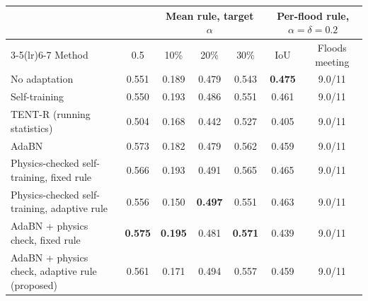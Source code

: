 \begin{tabular}{lcccccc}
\toprule
 & & \multicolumn{3}{c}{Mean rule, target $\alpha$} & \multicolumn{2}{c}{Per-flood rule, $\alpha=\delta=0.2$} \\
\cmidrule(lr){3-5}\cmidrule(lr){6-7}
Method & 0.5 & 10\% & 20\% & 30\% & IoU & Floods meeting \\
\midrule
No adaptation & 0.551 & 0.189 & 0.479 & 0.543 & \textbf{0.475} & 9.0/11 \\
Self-training \citep{chen2026cimttda} & 0.550 & 0.193 & 0.486 & 0.551 & 0.461 & 9.0/11 \\
TENT-R (running statistics) & 0.504 & 0.168 & 0.442 & 0.527 & 0.405 & 9.0/11 \\
AdaBN & 0.573 & 0.182 & 0.479 & 0.562 & 0.459 & 9.0/11 \\
Physics-checked self-training, fixed rule & 0.566 & 0.193 & 0.491 & 0.565 & 0.465 & 9.0/11 \\
Physics-checked self-training, adaptive rule & 0.556 & 0.150 & \textbf{0.497} & 0.551 & 0.463 & 9.0/11 \\
AdaBN + physics check, fixed rule & \textbf{0.575} & \textbf{0.195} & 0.481 & \textbf{0.571} & 0.439 & 9.0/11 \\
AdaBN + physics check, adaptive rule (proposed) & 0.561 & 0.171 & 0.494 & 0.557 & 0.459 & 9.0/11 \\
\bottomrule
\end{tabular}

